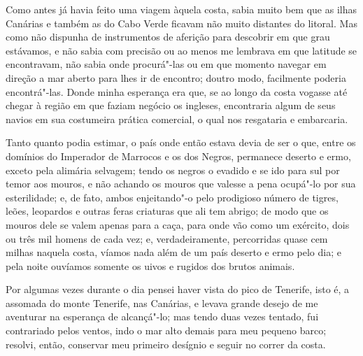 Como antes já havia feito uma viagem àquela costa, sabia muito bem que
as ilhas Canárias e também as do Cabo Verde ficavam não muito distantes
do litoral. Mas como não dispunha de instrumentos de aferição para
descobrir em que grau estávamos, e não sabia com precisão ou ao menos me
lembrava em que latitude se encontravam, não sabia onde procurá"-las ou
em que momento navegar em direção a mar aberto para lhes ir de encontro;
doutro modo, facilmente poderia encontrá"-las. Donde minha esperança era
que, se ao longo da costa vogasse até chegar à região em que faziam
negócio os ingleses, encontraria algum de seus navios em sua costumeira
prática comercial, o qual nos resgataria e embarcaria.

Tanto quanto podia estimar, o país onde então estava devia de ser o que,
entre os domínios do Imperador de Marrocos e os dos Negros, permanece
deserto e ermo, exceto pela alimária selvagem; tendo os negros o evadido
e se ido para sul por temor aos mouros, e não achando os mouros que
valesse a pena ocupá"-lo por sua esterilidade; e, de fato, ambos
enjeitando"-o pelo prodigioso número de tigres, leões, leopardos e outras
feras criaturas que ali tem abrigo; de modo que os mouros dele se valem
apenas para a caça, para onde vão como um exército, dois ou três mil
homens de cada vez; e, verdadeiramente, percorridas quase cem milhas
naquela costa, víamos nada além de um país deserto e ermo pelo dia; e
pela noite ouvíamos somente os uivos e rugidos dos brutos animais.

Por algumas vezes durante o dia pensei haver vista do pico de Tenerife,
isto é, a assomada do monte Tenerife, nas Canárias, e levava grande
desejo de me aventurar na esperança de alcançá"-lo; mas tendo duas vezes
tentado, fui contrariado pelos ventos, indo o mar alto demais para meu
pequeno barco; resolvi, então, conservar meu primeiro desígnio e seguir
no correr da costa.

